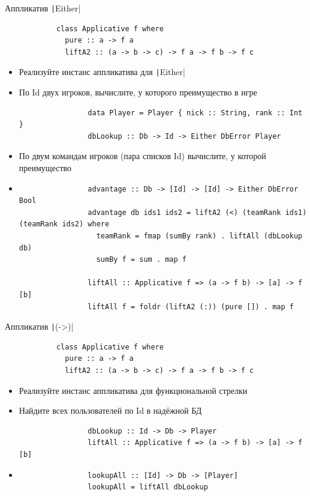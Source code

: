     \begin{frame}[fragile]{Аппликатив \texttt|Either|}
        \begin{verbatim}
            class Applicative f where
              pure :: a -> f a
              liftA2 :: (a -> b -> c) -> f a -> f b -> f c
        \end{verbatim}
        \begin{itemize}
            \item[\todo] Реализуйте инстанс аппликатива для \texttt|Either|
            \item[\todo] По Id двух игроков, вычислите, у которого преимущество в игре
            \begin{verbatim}
                data Player = Player { nick :: String, rank :: Int }
                dbLookup :: Db -> Id -> Either DbError Player
            \end{verbatim}
            \item[\todo] По двум командам игроков (пара списков Id) вычислите, у которой преимущество
            \item[\answer] \pause
            \begin{verbatim}
                advantage :: Db -> [Id] -> [Id] -> Either DbError Bool
                advantage db ids1 ids2 = liftA2 (<) (teamRank ids1) (teamRank ids2) where
                  teamRank = fmap (sumBy rank) . liftAll (dbLookup db)
                  sumBy f = sum . map f

                liftAll :: Applicative f => (a -> f b) -> [a] -> f [b]
                liftAll f = foldr (liftA2 (:)) (pure []) . map f
            \end{verbatim}
        \end{itemize}
    \end{frame}

    \begin{frame}[fragile]{Аппликатив \texttt|(->)|}
        \begin{verbatim}
            class Applicative f where
              pure :: a -> f a
              liftA2 :: (a -> b -> c) -> f a -> f b -> f c
        \end{verbatim}
        \begin{itemize}
            \item[\todo] Реализуйте инстанс аппликатива для функциональной стрелки
            \item[\todo] Найдите всех пользователей по Id в надёжной БД
            \begin{verbatim}
                dbLookup :: Id -> Db -> Player
                liftAll :: Applicative f => (a -> f b) -> [a] -> f [b]
            \end{verbatim}
            \item[\answer] \pause
            \begin{verbatim}
                lookupAll :: [Id] -> Db -> [Player]
                lookupAll = liftAll dbLookup
            \end{verbatim}
        \end{itemize}
    \end{frame}

